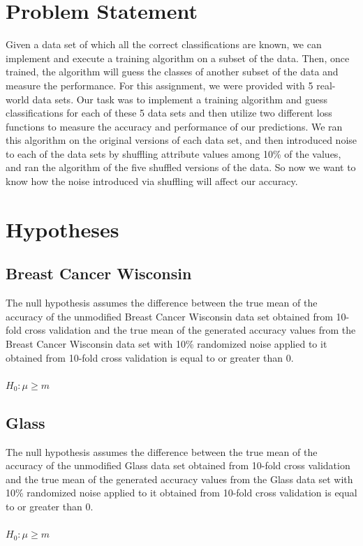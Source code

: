 \documentclass[twoside,11pt]{article}
\begin{document}
\section{Problem Statement}
Given a data set of which all the correct classifications are known, we can implement and execute a training algorithm on a subset of the data. Then, once trained, the algorithm will guess the classes of another subset of the data and measure the performance. For this assignment, we were provided with 5 real-world data sets. Our task was to implement a training algorithm and guess classifications for each of these 5 data sets and then utilize two different loss functions to measure the accuracy and performance of our predictions. We ran this algorithm on the original versions of each data set, and then introduced noise to each of the data sets by shuffling attribute values among 10\% of the values, and ran the algorithm of the five shuffled versions of the data. So now we want to know how the noise introduced via shuffling will affect our accuracy. \\
\section{Hypotheses}

\subsection{Breast Cancer Wisconsin} The null hypothesis assumes the difference between the true mean of the accuracy of the unmodified Breast Cancer Wisconsin data set obtained from 10-fold cross validation and the true mean of the generated accuracy values from the Breast Cancer Wisconsin data set with 10\% randomized noise applied to it obtained from 10-fold cross validation is equal to or greater than 0.\\\\
$H_0 : \mu \geq m$

\subsection{Glass} The null hypothesis assumes the difference between the true mean of the accuracy of the unmodified Glass data set obtained from 10-fold cross validation and the true mean of the generated accuracy values from the Glass data set with 10\% randomized noise applied to it obtained from 10-fold cross validation is equal to or greater than 0.\\\\
$H_0 : \mu \geq m$
\end{document}
